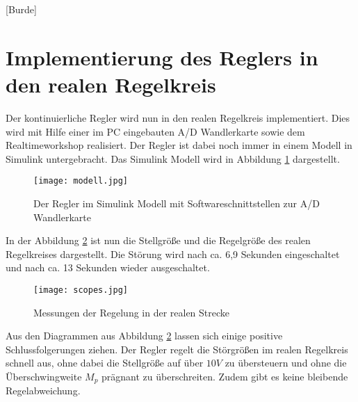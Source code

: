
\newpage

[Burde]
\section{Implementierung des Reglers in den realen Regelkreis}

Der kontinuierliche Regler wird nun in den realen Regelkreis implementiert. Dies wird mit Hilfe einer im PC eingebauten A/D Wandlerkarte sowie dem Realtimeworkshop realisiert. Der Regler ist dabei noch immer in einem Modell in Simulink untergebracht. Das Simulink Modell wird in Abbildung \ref{final_modell} dargestellt.

\begin{figure}[h]
	\begin{center}
		\texttt{[image: modell.jpg]}
		\caption{Der Regler im Simulink Modell mit Softwareschnittstellen zur A/D Wandlerkarte}
       \label{final_modell}
	\end{center} 
\end{figure}

\newpage

In der Abbildung \ref{scopes_real} ist nun die Stellgröße und die Regelgröße des realen Regelkreises dargestellt. Die Störung wird nach ca. 6,9 Sekunden eingeschaltet und nach ca. 13 Sekunden wieder ausgeschaltet.

\begin{figure}[h]
	\begin{center}
		\texttt{[image: scopes.jpg]}
		\caption{Messungen der Regelung in der realen Strecke}
       \label{scopes_real}
	\end{center} 
\end{figure}

Aus den Diagrammen aus Abbildung \ref{scopes_real} lassen sich einige positive Schlussfolgerungen ziehen. Der Regler regelt die Störgrößen im realen Regelkreis schnell aus, ohne dabei die Stellgröße auf über $10V$ zu übersteuern und ohne die Überschwingweite $M_{p}$ prägnant zu überschreiten. Zudem gibt es keine bleibende Regelabweichung.